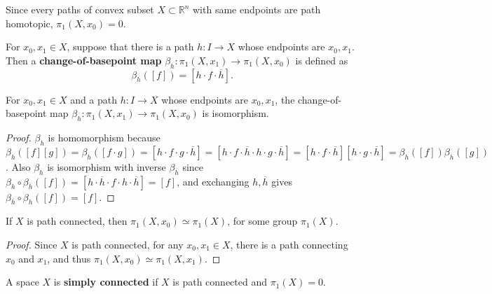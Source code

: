 \begin{exmp} Since every paths of convex subset $X\subset \mathbb{R}^n$ with same endpoints are path homotopic, $\pi_1(X,x_0)=0$.
\end{exmp}

\begin{defn} For $x_0,x_1\in X$, suppose that there is a path $h:I\rightarrow X$ whose endpoints are $x_0,x_1$. Then a \textbf{change-of-basepoint map} $\beta_h:\pi_1(X,x_1)\rightarrow \pi_1(X,x_0)$ is defined as
\begin{equation}
\beta_h([f])=[h\cdot f\cdot \overline{h}].
\end{equation}
\end{defn}

\begin{prop} For $x_0,x_1\in X$ and a path $h:I\rightarrow X$ whose endpoints are $x_0,x_1$, the change-of-basepoint map $\beta_h:\pi_1(X,x_1)\rightarrow \pi_1(X,x_0)$ is isomorphism. 
\end{prop}
\begin{proof} $\beta_h$ is homomorphism because $\beta_h([f][g])=\beta_h([f\cdot g])=[h\cdot f\cdot g\cdot \overline{h}]=[h\cdot f\cdot \overline{h}\cdot h\cdot g\cdot \overline{h}]=[h\cdot f\cdot \overline{h}][h\cdot g\cdot \overline{h}]=\beta_h([f])\beta_h([g])$. Also $\beta_h$ is isomorphism with inverse $\beta_{\overline{h}}$ since $\beta_h\circ \beta_{\overline{h}}([f])=[h\cdot \overline{h}\cdot f\cdot h\cdot \overline{h}]=[f]$, and exchanging $h,\overline{h}$ gives $\beta_{\overline{h}}\circ\beta_h([f])=[f]$.
\end{proof}

\begin{cor} If $X$ is path connected, then $\pi_1(X,x_0)\simeq \pi_1(X)$, for some group $\pi_1(X)$.
\end{cor}
\begin{proof} Since $X$ is path connected, for any $x_0,x_1\in X$, there is a path connecting $x_0$ and $x_1$, and thus $\pi_1(X,x_0)\simeq \pi_1(X,x_1)$.
\end{proof}

\begin{defn} A space $X$ is \textbf{simply connected} if $X$ is path connected and $\pi_1(X)=0$.
\end{defn}

